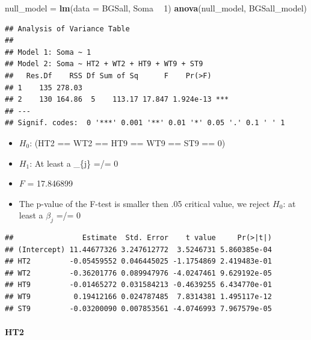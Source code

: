 \documentclass[]{article}
\newenvironment{Shaded}{\begin{snugshade}}{\end{snugshade}}
\newcommand{\KeywordTok}[1]{\textcolor[rgb]{0.13,0.29,0.53}{\textbf{#1}}}
\newcommand{\DataTypeTok}[1]{\textcolor[rgb]{0.13,0.29,0.53}{#1}}
\newcommand{\DecValTok}[1]{\textcolor[rgb]{0.00,0.00,0.81}{#1}}
\newcommand{\StringTok}[1]{\textcolor[rgb]{0.31,0.60,0.02}{#1}}
\newcommand{\CommentTok}[1]{\textcolor[rgb]{0.56,0.35,0.01}{\textit{#1}}}
\newcommand{\OperatorTok}[1]{\textcolor[rgb]{0.81,0.36,0.00}{\textbf{#1}}}
\newcommand{\NormalTok}[1]{#1}
\providecommand{\tightlist}{%
  \setlength{\itemsep}{0pt}\setlength{\parskip}{0pt}}
\let\oldparagraph\paragraph
\renewcommand{\paragraph}[1]{\oldparagraph{#1}\mbox{}}
\begin{document}
\begin{Shaded}
\begin{Highlighting}[]
\NormalTok{null_model =}\StringTok{ }\KeywordTok{lm}\NormalTok{(}\DataTypeTok{data =}\NormalTok{ BGSall, Soma }\OperatorTok{~}\StringTok{ }\DecValTok{1}\NormalTok{)}
\KeywordTok{anova}\NormalTok{(null_model, BGSall_model)}
\end{Highlighting}
\end{Shaded}

\begin{verbatim}
## Analysis of Variance Table
## 
## Model 1: Soma ~ 1
## Model 2: Soma ~ HT2 + WT2 + HT9 + WT9 + ST9
##   Res.Df    RSS Df Sum of Sq      F    Pr(>F)    
## 1    135 278.03                                  
## 2    130 164.86  5    113.17 17.847 1.924e-13 ***
## ---
## Signif. codes:  0 '***' 0.001 '**' 0.01 '*' 0.05 '.' 0.1 ' ' 1
\end{verbatim}

\begin{itemize}
\tightlist
\item
  \(H_{0}\): (HT2 == WT2 == HT9 == WT9 == ST9 == 0)
\item
  \(H_{1}\): At least a \beta\_\{j\} =/= 0
\item
  \(F\) = 17.846899
\item
  The p-value of the F-test is smaller then .05 critical value, we
  reject \(H_{0}\): at least a \(\beta_{j}\) =/= 0 
\end{itemize}

\begin{Shaded}
\end{Shaded}

\begin{verbatim}
##                Estimate  Std. Error    t value     Pr(>|t|)
## (Intercept) 11.44677326 3.247612772  3.5246731 5.860385e-04
## HT2         -0.05459552 0.046445025 -1.1754869 2.419483e-01
## WT2         -0.36201776 0.089947976 -4.0247461 9.629192e-05
## HT9         -0.01465272 0.031584213 -0.4639255 6.434770e-01
## WT9          0.19412166 0.024787485  7.8314381 1.495117e-12
## ST9         -0.03200090 0.007853561 -4.0746993 7.967579e-05
\end{verbatim}

\paragraph{HT2}\label{ht2}
\end{document}
